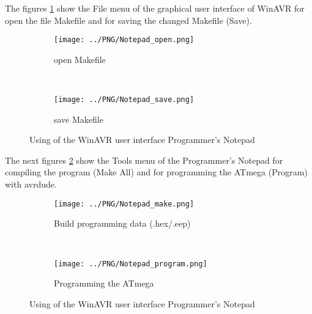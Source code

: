 The figures \ref{fig:WinAVR1} show the File menu of the graphical user interface of WinAVR for
open the file Makefile and for saving the changed Makefile (Save).

\begin{figure}[H]
  \begin{subfigure}[b]{.5\textwidth}
    \centering
    \texttt{[image: ../PNG/Notepad\_open.png]}
    \caption{open Makefile}
  \end{subfigure}
  ~
  \begin{subfigure}[b]{.5\textwidth}
    \centering
    \texttt{[image: ../PNG/Notepad\_save.png]}
    \caption{save Makefile}
  \end{subfigure}
  \caption{Using of the WinAVR user interface Programmer's Notepad}
  \label{fig:WinAVR1}
\end{figure}

The next figures \ref{fig:WinAVR2} show the Tools menu of the Programmer's Notepad
for compiling the program (Make All) and for programming the ATmega (Program) with avrdude.

\begin{figure}[H]
  \begin{subfigure}[b]{.5\textwidth}
    \centering
    \texttt{[image: ../PNG/Notepad\_make.png]}
    \caption{Build programming data (.hex/.eep)}
  \end{subfigure}
  ~
  \begin{subfigure}[b]{.5\textwidth}
    \centering
    \texttt{[image: ../PNG/Notepad\_program.png]}
    \caption{Programming the ATmega}
  \end{subfigure}
  \caption{Using of the WinAVR user interface Programmer's Notepad}
  \label{fig:WinAVR2}
\end{figure}



